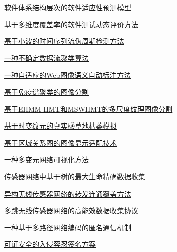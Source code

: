 \documentclass[a4paper]{article}
\begin{document}
\href{http://www.jos.org.cn/ch/reader/download_pdf.aspx?file_no=3643&year_id=2010&quarter_id=9&falg=1}{软件体系结构层次的软件适应性预测模型}

\href{http://www.jos.org.cn/ch/reader/download_pdf.aspx?file_no=3659&year_id=2010&quarter_id=9&falg=1}{基于多维度覆盖率的软件测试动态评价方法}

\href{http://www.jos.org.cn/ch/reader/download_pdf.aspx?file_no=3633&year_id=2010&quarter_id=9&falg=1}{基于小波的时间序列流伪周期检测方法}

\href{http://www.jos.org.cn/ch/reader/download_pdf.aspx?file_no=3654&year_id=2010&quarter_id=9&falg=1}{一种不确定数据流聚类算法}

\href{http://www.jos.org.cn/ch/reader/download_pdf.aspx?file_no=3658&year_id=2010&quarter_id=9&falg=1}{一种自适应的Web图像语义自动标注方法}

\href{http://www.jos.org.cn/ch/reader/download_pdf.aspx?file_no=3581&year_id=2010&quarter_id=9&falg=1}{基于免疫谱聚类的图像分割}

\href{http://www.jos.org.cn/ch/reader/download_pdf.aspx?file_no=3621&year_id=2010&quarter_id=9&falg=1}{基于EHMM-HMT和MSWHMT的多尺度纹理图像分割}

\href{http://www.jos.org.cn/ch/reader/download_pdf.aspx?file_no=3719&year_id=2010&quarter_id=9&falg=1}{基于时变纹元的真实感草地枯萎模拟}

\href{http://www.jos.org.cn/ch/reader/download_pdf.aspx?file_no=3850&year_id=2010&quarter_id=9&falg=1}{基于区域关系图的图像显示适配技术}

\href{http://www.jos.org.cn/ch/reader/download_pdf.aspx?file_no=3889&year_id=2010&quarter_id=9&falg=1}{一种多变元网络可视化方法}

\href{http://www.jos.org.cn/ch/reader/download_pdf.aspx?file_no=3684&year_id=2010&quarter_id=9&falg=1}{传感器网络中基于树的最大生命精确数据收集}

\href{http://www.jos.org.cn/ch/reader/download_pdf.aspx?file_no=3623&year_id=2010&quarter_id=9&falg=1}{异构无线传感器网络的转发连通覆盖方法}

\href{http://www.jos.org.cn/ch/reader/download_pdf.aspx?file_no=3702&year_id=2010&quarter_id=9&falg=1}{多跳无线传感器网络的高能效数据收集协议}

\href{http://www.jos.org.cn/ch/reader/download_pdf.aspx?file_no=3612&year_id=2010&quarter_id=9&falg=1}{一种基于多路径网络编码的匿名通信机制}

\href{http://www.jos.org.cn/ch/reader/download_pdf.aspx?file_no=3772&year_id=2010&quarter_id=9&falg=1}{可证安全的入侵容忍签名方案}
\end{document}
